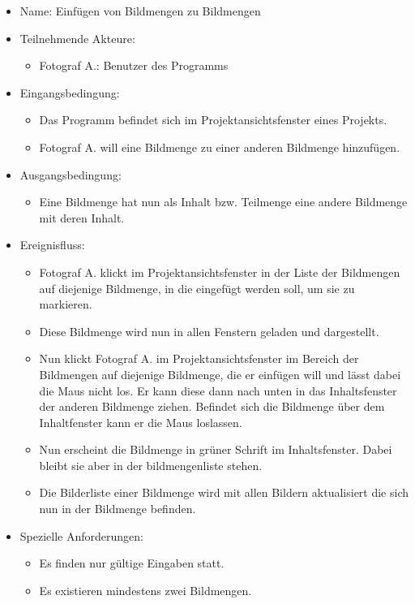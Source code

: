 \begin{itemize}
	\begin{itemize}
		\item Name: Einfügen von Bildmengen zu Bildmengen
		\item Teilnehmende Akteure:
		\begin{itemize}
			\item	Fotograf A.: Benutzer des Programms		
		\end{itemize}
		\item Eingangsbedingung:
		\begin{itemize}
			\item	Das Programm befindet sich im Projektansichtsfenster eines Projekts.
			\item Fotograf A. will eine Bildmenge zu einer anderen Bildmenge hinzufügen.
		\end{itemize}
		\item Ausgangsbedingung:
		\begin{itemize}
			\item	Eine Bildmenge hat nun als Inhalt bzw. Teilmenge eine andere Bildmenge mit deren Inhalt. 	
		\end{itemize}
		\item Ereignisfluss:
		\begin{itemize}
			\item Fotograf A. klickt im Projektansichtsfenster in der Liste der Bildmengen auf diejenige Bildmenge, in die eingefügt werden soll, um sie zu markieren.
			\item Diese Bildmenge wird nun in allen Fenstern geladen und dargestellt.
			\item Nun klickt Fotograf A. im Projektansichtsfenster im Bereich der Bildmengen auf diejenige Bildmenge, die er einfügen will und lässt dabei die Maus nicht los. Er kann diese dann nach unten in das Inhaltsfenster der anderen Bildmenge ziehen. Befindet sich die Bildmenge über dem Inhaltfenster kann er die Maus loslassen.
			\item Nun erscheint die Bildmenge in grüner Schrift im Inhaltsfenster. Dabei bleibt sie aber in der bildmengenliste stehen.
			\item Die Bilderliste einer Bildmenge wird mit allen Bildern aktualisiert die sich nun in der Bildmenge befinden.
		\end{itemize}
		\item Spezielle Anforderungen:
		\begin{itemize}
			\item	Es finden nur gültige Eingaben statt.
			\item Es existieren mindestens zwei Bildmengen.
		\end{itemize}			
	\end{itemize}
	

\end{itemize}
